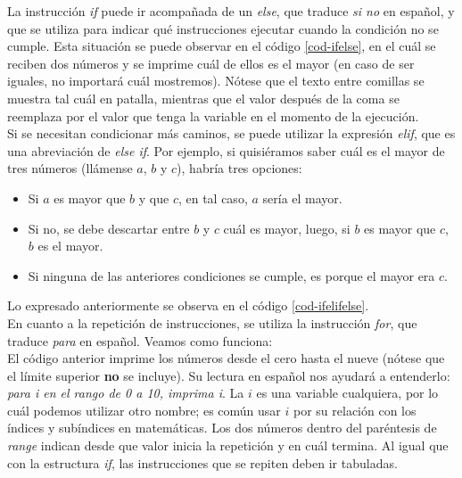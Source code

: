 


La instrucción \emph{if} puede ir acompañada de un \emph{else}, que traduce \emph{si no} en español, y que se utiliza para indicar qué instrucciones ejecutar cuando la condición no se cumple. Esta situación se puede observar en el código \ref{cod-ifelse}, en el cuál se reciben dos números y se imprime cuál de ellos es el mayor (en caso de ser iguales, no importará cuál mostremos). Nótese que el texto entre comillas se muestra tal cuál en patalla, mientras que el valor después de la coma se reemplaza por el valor que tenga la variable en el momento de la ejecución. \\



Si se necesitan condicionar más caminos, se puede utilizar la expresión \emph{elif}, que es una abreviación de \emph{else if}. Por ejemplo, si quisiéramos saber cuál es el mayor de tres números (llámense $a$, $b$ y $c$), habría tres opciones: 
\begin{itemize}
\item Si $a$ es mayor que $b$ y que $c$, en tal caso, $a$ sería el mayor.

\item Si no, se debe descartar entre $b$ y $c$ cuál es mayor, luego, si $b$ es mayor que $c$, $b$ es el mayor.

\item Si ninguna de las anteriores condiciones se cumple, es porque el mayor era $c$. 
\end{itemize}


Lo expresado anteriormente se observa en el código \ref{cod-ifelifelse}.  \\



En cuanto a la repetición de instrucciones, se utiliza la instrucción \emph{for}, que traduce \emph{para} en español. Veamos como funciona: \\



El código anterior imprime los números desde el cero hasta el nueve (nótese que el límite superior \textbf{no} se incluye). Su lectura en español nos ayudará a entenderlo: \emph{para i en el rango de 0 a 10, imprima i}. La $i$ es una variable cualquiera, por lo cuál podemos utilizar otro nombre; es común usar $i$ por su relación con los índices y subíndices en matemáticas. Los dos números dentro del paréntesis de \emph{range} indican desde que valor inicia la repetición y en cuál termina. Al igual que con la estructura \emph{if}, las instrucciones que se repiten deben ir tabuladas.


